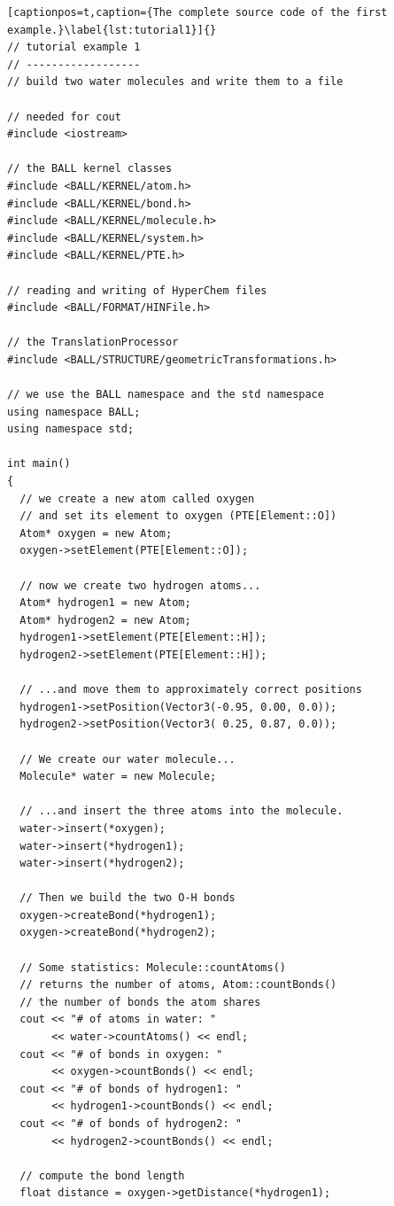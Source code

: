 \newpage
\begin{lstlisting}[captionpos=t,caption={The complete source code of the first example.}\label{lst:tutorial1}]{}
// tutorial example 1
// ------------------
// build two water molecules and write them to a file

// needed for cout
#include <iostream>

// the BALL kernel classes
#include <BALL/KERNEL/atom.h>
#include <BALL/KERNEL/bond.h>
#include <BALL/KERNEL/molecule.h>
#include <BALL/KERNEL/system.h>
#include <BALL/KERNEL/PTE.h>

// reading and writing of HyperChem files
#include <BALL/FORMAT/HINFile.h>

// the TranslationProcessor
#include <BALL/STRUCTURE/geometricTransformations.h>

// we use the BALL namespace and the std namespace
using namespace BALL;
using namespace std;

int main()
{
  // we create a new atom called oxygen
  // and set its element to oxygen (PTE[Element::O])
  Atom* oxygen = new Atom;
  oxygen->setElement(PTE[Element::O]);

  // now we create two hydrogen atoms...
  Atom* hydrogen1 = new Atom;
  Atom* hydrogen2 = new Atom;
  hydrogen1->setElement(PTE[Element::H]);
  hydrogen2->setElement(PTE[Element::H]);

  // ...and move them to approximately correct positions
  hydrogen1->setPosition(Vector3(-0.95, 0.00, 0.0));
  hydrogen2->setPosition(Vector3( 0.25, 0.87, 0.0));

  // We create our water molecule...
  Molecule* water = new Molecule;

  // ...and insert the three atoms into the molecule.
  water->insert(*oxygen);
  water->insert(*hydrogen1);
  water->insert(*hydrogen2);

  // Then we build the two O-H bonds
  oxygen->createBond(*hydrogen1);
  oxygen->createBond(*hydrogen2);

  // Some statistics: Molecule::countAtoms() 
  // returns the number of atoms, Atom::countBonds() 
  // the number of bonds the atom shares
  cout << "# of atoms in water: " 
       << water->countAtoms() << endl;
  cout << "# of bonds in oxygen: " 
       << oxygen->countBonds() << endl;
  cout << "# of bonds of hydrogen1: " 
       << hydrogen1->countBonds() << endl;
  cout << "# of bonds of hydrogen2: " 
       << hydrogen2->countBonds() << endl;

  // compute the bond length
  float distance = oxygen->getDistance(*hydrogen1);


\end{lstlisting}
